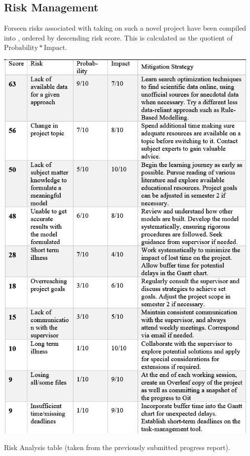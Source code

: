 \subsection{Risk Management}

Forseen risks associated with taking on such a novel project have been compiled into , ordered by descending risk score. This is calculated as the quotient of $\mathrm{Probability * Impact}$.

\begin{table}[!htb]
    \includegraphics[width=13cm,center]{Figures/RiskTable2.png}
    \caption{Risk Analysis table (taken from the previously submitted progress report).}
    \label{Figure:RiskTable}
\end{table}

